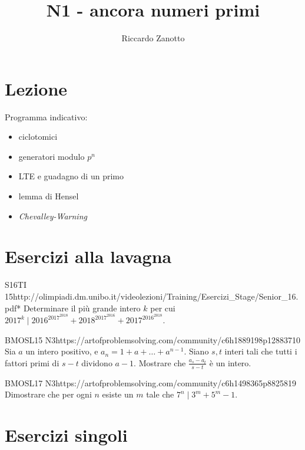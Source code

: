 \documentclass[12pt]{article}
\author{Riccardo Zanotto}
\title{N1 - ancora numeri primi}
\begin{document}
\maketitle


\section{Lezione}

Programma indicativo:

\begin{itemize}
    \item ciclotomici
    \item generatori modulo $p^n$
    \item LTE e guadagno di un primo
    \item lemma di Hensel
    \item \textit{Chevalley-Warning}
\end{itemize}

\section{Esercizi alla lavagna}

\begin{esercizio}{S16TI 15}{http://olimpiadi.dm.unibo.it/videolezioni/Training/Esercizi_Stage/Senior_16.pdf}{*}
    Determinare il più grande intero $k$ per cui $2017^k\mid 2016^{2017^{2018}}+2018^{2017^{2016}}+2017^{2016^{2018}}$.
\end{esercizio}

\begin{esercizio}{BMOSL15 N3}{https://artofproblemsolving.com/community/c6h1889198p12883710}
    Sia $a$ un intero positivo, e $a_n=1+a+\dots+a^{n-1}$. Siano $s,t$ interi tali che tutti i fattori primi di $s-t$ dividono $a-1$. Mostrare che $\frac{a_s-a_t}{s-t}$ è un intero.
\end{esercizio}

\begin{esercizio}{BMOSL17 N3}{https://artofproblemsolving.com/community/c6h1498365p8825819}
    Dimostrare che per ogni $n$ esiste un $m$ tale che $7^n\mid 3^m+5^m-1$.
\end{esercizio}

\section{Esercizi singoli}
\end{document}
